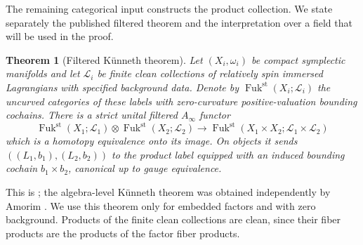 \documentclass[11pt]{article}
\numberwithin{equation}{section}
\newtheorem{theorem}{Theorem}[section]
\theoremstyle{definition}
\theoremstyle{remark}
\begin{document}
The remaining categorical input constructs the product collection.
We state separately the published filtered theorem and the
interpretation over a field that will be used in the proof.

\begin{theorem}[Filtered K\"unneth theorem]
\label{thm:filtered-kunneth}
Let $(X_i,\omega_i)$ be compact symplectic manifolds and let
$\mathcal L_i$ be finite clean collections of relatively spin
immersed Lagrangians with specified background data.  Denote
by $\operatorname{Fuk}^{\mathrm{st}}(X_i;\mathcal L_i)$ the
uncurved categories of these labels with zero-curvature
positive-valuation bounding cochains.  There is a strict unital
filtered $A_\infty$ functor
\[
 \operatorname{Fuk}^{\mathrm{st}}(X_1;\mathcal L_1)
 \otimes
 \operatorname{Fuk}^{\mathrm{st}}(X_2;\mathcal L_2)
 \longrightarrow
 \operatorname{Fuk}^{\mathrm{st}}
 (X_1\times X_2;\mathcal L_1\times\mathcal L_2)
\]
which is a homotopy equivalence onto its image.  On objects it
sends $((L_1,b_1),(L_2,b_2))$ to the product label equipped with
an induced bounding cochain $b_1\times b_2$, canonical up to
gauge equivalence.
\end{theorem}

This is \cite[Situation~16.8, Theorem~16.9, and
Corollary~16.10]{Floer:Fukaya}; the algebra-level K\"unneth theorem
was obtained independently by Amorim \cite{HMS:AmorimKunneth}.
We use this theorem only for embedded factors and with zero
background.  Products of the finite clean collections are clean,
since their fiber products are the products of the factor fiber
products.
\end{document}
